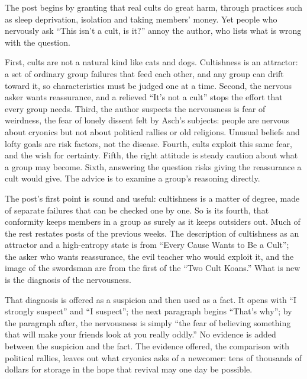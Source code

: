 \begin{afterword}
\summaryhead

The post begins by granting that real cults do great harm, through practices such as sleep deprivation, isolation and taking members' money. Yet people who nervously ask ``This isn't a cult, is it?'' annoy the author, who lists what is wrong with the question.

First, cults are not a natural kind like cats and dogs. Cultishness is an attractor: a set of ordinary group failures that feed each other, and any group can drift toward it, so characteristics must be judged one at a time. Second, the nervous asker wants reassurance, and a relieved ``It's not a cult'' stops the effort that every group needs. Third, the author suspects the nervousness is fear of weirdness, the fear of lonely dissent felt by Asch's subjects: people are nervous about cryonics but not about political rallies or old religions. Unusual beliefs and lofty goals are risk factors, not the disease. Fourth, cults exploit this same fear, and the wish for certainty. Fifth, the right attitude is steady caution about what a group may become. Sixth, answering the question risks giving the reassurance a cult would give. The advice is to examine a group's reasoning directly.

\responsehead

The post's first point is sound and useful: cultishness is a matter of degree, made of separate failures that can be checked one by one. So is its fourth, that conformity keeps members in a group as surely as it keeps outsiders out. Much of the rest restates posts of the previous weeks. The description of cultishness as an attractor and a high-entropy state is from ``Every Cause Wants to Be a Cult''; the asker who wants reassurance, the evil teacher who would exploit it, and the image of the swordsman are from the first of the ``Two Cult Koans.'' What is new is the diagnosis of the nervousness.

That diagnosis is offered as a suspicion and then used as a fact. It opens with ``I strongly suspect'' and ``I suspect''; the next paragraph begins ``That's why''; by the paragraph after, the nervousness is simply ``the fear of believing something that will make your friends look at you really oddly.'' No evidence is added between the suspicion and the fact. The evidence offered, the comparison with political rallies, leaves out what cryonics asks of a newcomer: tens of thousands of dollars for storage in the hope that revival may one day be possible.


\end{afterword}
